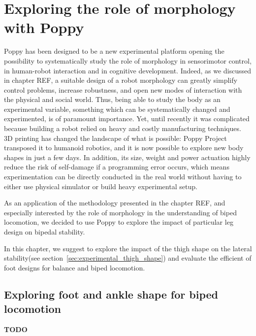 
\chapter{Exploring the role of morphology with Poppy} %
\label{cha:exploring_the_role_of_morphology}


Poppy has been designed to be a new experimental platform opening the possibility to systematically study the role of morphology in sensorimotor control, in human-robot interaction and in cognitive development. Indeed, as we discussed in chapter REF, a suitable design of a robot morphology can greatly simplify control problems, increase robustness, and open new modes of interaction with the physical and social world. Thus, being able to study the body as an experimental variable, something which can be systematically changed and experimented, is of paramount importance. Yet, until recently it was complicated because building a robot relied on heavy and costly manufacturing techniques. 3D printing has changed the landscape of what is possible: Poppy Project transposed it to humanoid robotics, and it is now possible to explore new body shapes in just a few days. In addition, its size, weight and power actuation highly reduce the risk of self-damage if a programming error occurs, which means experimentation can be directly conducted in the real world without having to either use physical simulator or build heavy experimental setup.

As an application of the methodology presented in the chapter REF, and especially interested by the role of morphology in the understanding of biped locomotion, we decided to use Poppy to explore the impact of particular leg design on bipedal stability.

In this chapter, we suggest to explore the impact of the thigh shape on the lateral stability(see section~\ref{sec:experimental_thigh_shape}) and evaluate the efficient of foot designs for balance and biped locomotion.



\section{Exploring foot and ankle shape for biped locomotion} %
\textbf{TODO}


